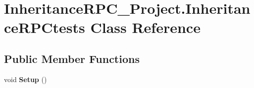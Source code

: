 \hypertarget{class_inheritance_r_p_c___project_1_1_inheritance_r_p_ctests}{\section{Inheritance\+R\+P\+C\+\_\+\+Project.\+Inheritance\+R\+P\+Ctests Class Reference}
\label{class_inheritance_r_p_c___project_1_1_inheritance_r_p_ctests}
}
\subsection*{Public Member Functions}
\begin{DoxyCompactItemize}
\item 
\hypertarget{class_inheritance_r_p_c___project_1_1_inheritance_r_p_ctests_ae9916e05afb98530099b931081a67a5d}{void {\bfseries Setup} ()}\label{class_inheritance_r_p_c___project_1_1_inheritance_r_p_ctests_ae9916e05afb98530099b931081a67a5d}


\end{DoxyCompactItemize}
